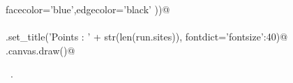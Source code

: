 \documentclass[11.5pt]{report}
\begin{document}
\begin{flushleft}
\begin{list}{}{}
\mbox{}\verb@                 facecolor='blue',edgecolor='black' ))@\\
\mbox{}\verb@@\\
\mbox{}\verb@ax.set_title('Points : ' + str(len(run.sites)), fontdict={'fontsize':40})@\\
\mbox{}\verb@fig.canvas.draw()@\\
\mbox{}\verb@@{\NWsep}
\end{list}
\vspace{-1.5ex}
\footnotesize
\begin{list}{}{\setlength{\itemsep}{-\parsep}\setlength{\itemindent}{-\leftmargin}}
\item \NWtxtMacroRefIn\ .

\item{}
\end{list}
\vspace{4ex}
\end{flushleft}
\newchunk 
\end{document}
